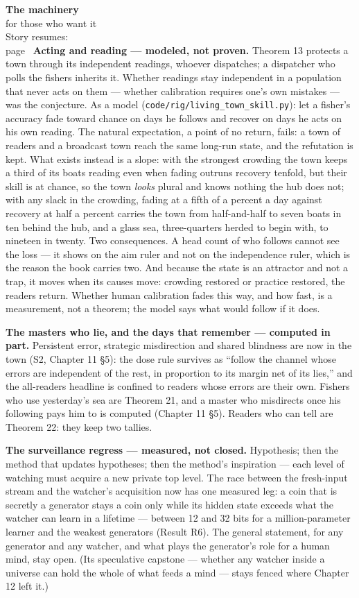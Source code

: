 \begin{machinery}{\textbf{The machinery}\\for those who want it\\[3pt]{\color{muted}Story resumes:\\page~\pageref{ch15-s5}}}
\textbf{Acting and reading --- modeled, not proven.} Theorem 13 protects a
town through its independent readings, whoever dispatches; a
dispatcher who polls the fishers inherits it. Whether readings stay
independent in a population that never acts on them --- whether
calibration requires one's own mistakes --- was the conjecture. As a
model (\texttt{code/\allowbreak{}rig/\allowbreak{}living\_\allowbreak{}town\_\allowbreak{}skill.\allowbreak{}py}): let a fisher's accuracy fade
toward chance on days he follows and recover on days he acts on his
own reading. The natural expectation, a point of no return, fails: a
town of readers and a broadcast town reach the same long-run state,
and the refutation is kept. What exists instead is a slope: with the
strongest crowding the town keeps a third of its boats reading even
when fading outruns recovery tenfold, but their skill is at chance, so
the town \emph{looks} plural and knows nothing the hub does not; with any
slack in the crowding, fading at a fifth of a percent a day against
recovery at half a percent carries the town from half-and-half to
seven boats in ten behind the hub, and a glass sea, three-quarters
herded to begin with, to nineteen in twenty. Two consequences. A head count of who follows cannot see the
loss --- it shows on the aim ruler and not on the independence ruler,
which is the reason the book carries two. And because the state is an
attractor and not a trap, it moves when its causes move: crowding
restored or practice restored, the readers return. Whether human
calibration fades this way, and how fast, is a measurement, not a
theorem; the model says what would follow if it does.

\textbf{The masters who lie, and the days that remember --- computed in
part.} Persistent error, strategic misdirection and shared blindness
are now in the town (S2, Chapter 11 §5): the dose rule survives as
``follow the channel whose errors are independent of the rest, in
proportion to its margin net of its lies,'' and the all-readers
headline is confined to readers whose errors are their own. Fishers
who use yesterday's sea are Theorem 21, and a master who misdirects
once his following pays him to is computed (Chapter 11 §5). Readers
who can tell are Theorem 22: they keep two tallies.

\textbf{The surveillance regress --- measured, not closed.} Hypothesis; then
the method that updates hypotheses; then the method's inspiration ---
each level of watching must acquire a new private top level. The race
between the fresh-input stream and the watcher's acquisition now has
one measured leg: a coin that is secretly a generator stays a coin only
while its hidden state exceeds what the watcher can learn in a lifetime
--- between 12 and 32 bits for a million-parameter learner and the
weakest generators (Result R6). The general statement, for any
generator and any watcher, and what plays the generator's role for a
human mind, stay open. (Its
speculative capstone --- whether any watcher inside a universe can hold
the whole of what feeds a mind --- stays fenced where Chapter 12 left
it.)


\end{machinery}
